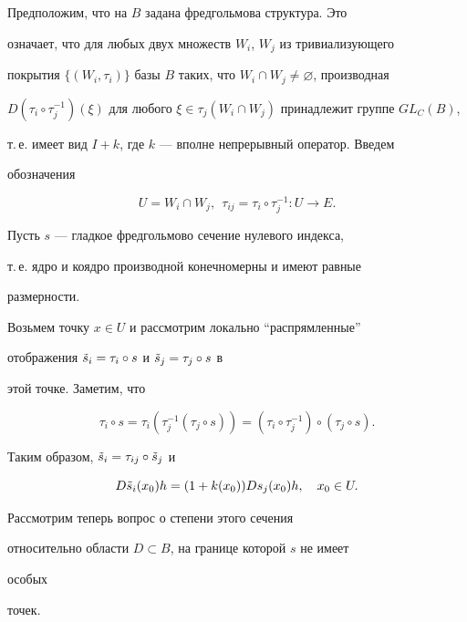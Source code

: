 Предположим, что на $B$ задана фредгольмова структура. Это 


означает, что для любых двух множеств $W_i$, $W_j$ из тривиализующего 


покрытия $\{(W_i,\tau_i)\}$ базы $B$ таких, что $W_i\cap 


W_j\ne\varnothing$, производная 


$D(\tau_i\circ\tau^{-1}_j)(\xi)$ для любого $\xi\in \tau_j(W_i\cap 


W_j)$ принадлежит группе $GL_C(B)$, 


т.\,е. имеет вид $I+k$, где $k$ --- вполне непрерывный оператор. Введем 


обозначения


$$


U=W_i\cap W_j,\ \  \tau_{ij}=\tau_i\circ\tau_j^{-1}:U\to E. 


$$


 


Пусть $s$ --- гладкое фредгольмово сечение нулевого индекса, 


т.\,е. ядро и коядро производной конечномерны и имеют равные 


размерности. 


Возьмем точку $x\in U$ и рассмотрим локально ``распрямленные'' 


отображения $\Tilde s_i=\tau_i\circ s$ и $\Tilde s_j=\tau_j\circ s$ в 


этой точке. Заметим, что 


$$ 


\tau_i\circ s=\tau_i(\tau^{-1}_j(\tau_j\circ s))= 


(\tau_i\circ \tau^{-1}_j)\circ(\tau_j\circ s). 


$$ 


 


Таким образом, $\Tilde s_i=\tau_{ij}\circ\Tilde s_j$ и 


$$ 


D\Tilde s_i(x_0)h=(1+k(x_0))D s_j(x_0)h,\quad x_0\in U. 


$$ 


 


Рассмотрим теперь вопрос о степени этого сечения 


относительно области $D\subset B$, на границе которой $s$ не имеет 


особых 


точек. 


